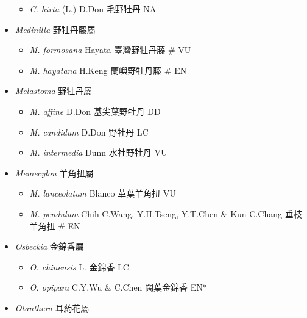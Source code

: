 \begin{itemize}
  \begin{itemize}
        \item[] \textit{C. hirta} (L.) D.Don  毛野牡丹   NA
  \end{itemize}
 \item[] \textit{Medinilla} 野牡丹藤屬
                                
  \begin{itemize}
        \item[] \textit{M. formosana} Hayata  臺灣野牡丹藤  \# VU
        \item[] \textit{M. hayatana} H.Keng  蘭嶼野牡丹藤  \# EN
  \end{itemize}
 \item[] \textit{Melastoma} 野牡丹屬
                                
  \begin{itemize}
        \item[] \textit{M. affine} D.Don  基尖葉野牡丹   DD
        \item[] \textit{M. candidum} D.Don  野牡丹   LC
        \item[] \textit{M. intermedia} Dunn  水社野牡丹   VU
  \end{itemize}
 \item[] \textit{Memecylon} 羊角扭屬
                                
  \begin{itemize}
        \item[] \textit{M. lanceolatum} Blanco  革葉羊角扭   VU
        \item[] \textit{M. pendulum} Chih C.Wang, Y.H.Tseng, Y.T.Chen \& Kun C.Chang  垂枝羊角扭  \# EN
  \end{itemize}
 \item[] \textit{Osbeckia} 金錦香屬
                                
  \begin{itemize}
        \item[] \textit{O. chinensis} L.  金錦香   LC
        \item[] \textit{O. opipara} C.Y.Wu \& C.Chen  闊葉金錦香   EN*
  \end{itemize}
 \item[] \textit{Otanthera} 耳葯花屬
                                

\end{itemize}
